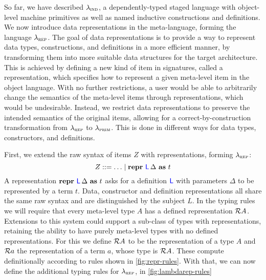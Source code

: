 So far, we have described $\lambda_{\textsc{ind}}$, a dependently-typed staged language
with object-level machine primitives as well as named inductive constructions
and definitions. We now introduce data representations in the meta-language,
forming the language $\lambda_{\textsc{rep}}$. The goal of data representations is to
provide a way to represent data types, constructions, and definitions in a more
efficient manner, by transforming them into more suitable data structures for
the target architecture. This is achieved by defining a new kind of item in
signatures, called a representation, which specifies how to represent a given
meta-level item in the object language. With no further restrictions, a user
would be able to arbitrarily change the semantics of the meta-level items
through representations, which would be undesirable. Instead, we restrict data
representations to preserve the intended semantics of the original items,
allowing for a correct-by-construction transformation from $\lambda_{\textsc{rep}}$ to
$\lambda_{\textsc{prim}}$. This is done in different ways for data types, constructors, and
definitions.

First, we extend the raw syntax of items $Z$ with representations, forming
$\lambda_{\textsc{rep}}$:
\[
  Z ::= \ldots \mid \textbf{repr} \ {\color{blue}{\mathsf{L}}}\, {\Delta}\ \textbf{as}\ {t}
\]
A representation $\textbf{repr} \ {\color{blue}{\mathsf{L}}}\, {\Delta}\ \textbf{as}\ {t}$ asks for a definition ${\color{blue}{\mathsf{L}}}$ with
parameters $\Delta$ to be represented by a term $t$. Data, constructor and
definition representations all share the same raw syntax and are distinguished
by the subject $L$. In the typing rules we will require that every meta-level
type $A$ has a defined representation $\mathcal{R} {A}$. Extensions to this system
could support a sub-class of types with representations, retaining the ability
to have purely meta-level types with no defined representations. For this we
define $\mathcal{R} {A}$ to be the representation of a type $A$ and $\mathcal{R} {a}$ the
representation of a term $a$, whose type is $\mathcal{R} {A}$. These compute
definitionally according to rules shown in \cref{fig:repr-rules}. With that, we
can now define the additional typing rules for $\lambda_{\textsc{rep}}$, in
\cref{fig:lambdarep-rules}

\newcommand\eqrule[1]{\begin{array}[t]{ll}{#1}\end{array}}

